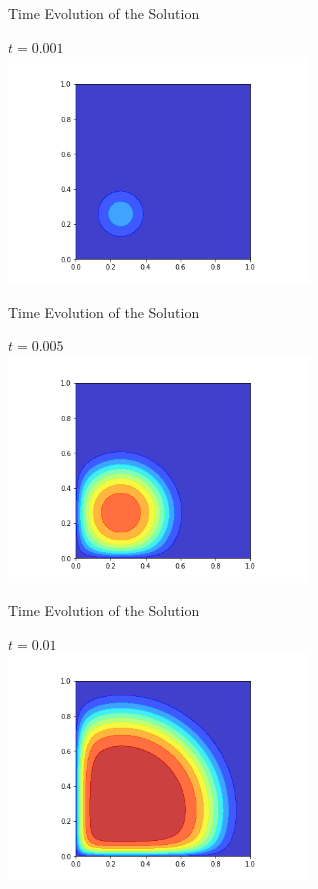 \documentclass[aspectratio=43]{beamer}
\begin{document}
\begin{frame}[fragile]{Time Evolution of the Solution}
    \begin{center}
        $t=0.001$ \\
        \includegraphics[width=0.6\textwidth]{./image_png/output001.png}
    \end{center}
\end{frame}

\begin{frame}[fragile]{Time Evolution of the Solution}
    \begin{center}
        $t=0.005$ \\
        \includegraphics[width=0.6\textwidth]{./image_png/output005.png}
    \end{center}
\end{frame}

\begin{frame}[fragile]{Time Evolution of the Solution}
    \begin{center}
        $t=0.01$ \\
        \includegraphics[width=0.6\textwidth]{./image_png/output01.png}
    \end{center}
\end{frame}
\end{document}
